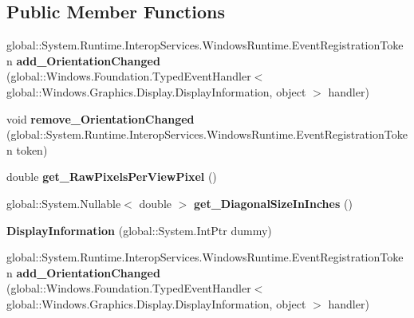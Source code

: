 \subsection*{Public Member Functions}
\begin{DoxyCompactItemize}
\item 
\mbox{\label{class_windows_1_1_graphics_1_1_display_1_1_display_information_ab25de6d82f535e3e82722b7b34a2e485}} 
global\+::\+System.\+Runtime.\+Interop\+Services.\+Windows\+Runtime.\+Event\+Registration\+Token {\bfseries add\+\_\+\+Orientation\+Changed} (global\+::\+Windows.\+Foundation.\+Typed\+Event\+Handler$<$ global\+::\+Windows.\+Graphics.\+Display.\+Display\+Information, object $>$ handler)
\item 
\mbox{\label{class_windows_1_1_graphics_1_1_display_1_1_display_information_a56bbdaab1ef2d9feb7c4b16d8d9f3a3a}} 
void {\bfseries remove\+\_\+\+Orientation\+Changed} (global\+::\+System.\+Runtime.\+Interop\+Services.\+Windows\+Runtime.\+Event\+Registration\+Token token)
\item 
\mbox{\label{class_windows_1_1_graphics_1_1_display_1_1_display_information_a9dc97c2bae189efb6b8e34a738397257}} 
double {\bfseries get\+\_\+\+Raw\+Pixels\+Per\+View\+Pixel} ()
\item 
\mbox{\label{class_windows_1_1_graphics_1_1_display_1_1_display_information_acf94f914fc79e6744c2000d54965e060}} 
global\+::\+System.\+Nullable$<$ double $>$ {\bfseries get\+\_\+\+Diagonal\+Size\+In\+Inches} ()
\item 
\mbox{\label{class_windows_1_1_graphics_1_1_display_1_1_display_information_a0cf7eebf1d214c165095e5dcf34c9b50}} 
{\bfseries Display\+Information} (global\+::\+System.\+Int\+Ptr dummy)
\item 
\mbox{\label{class_windows_1_1_graphics_1_1_display_1_1_display_information_ab25de6d82f535e3e82722b7b34a2e485}} 
global\+::\+System.\+Runtime.\+Interop\+Services.\+Windows\+Runtime.\+Event\+Registration\+Token {\bfseries add\+\_\+\+Orientation\+Changed} (global\+::\+Windows.\+Foundation.\+Typed\+Event\+Handler$<$ global\+::\+Windows.\+Graphics.\+Display.\+Display\+Information, object $>$ handler)

\end{DoxyCompactItemize}
